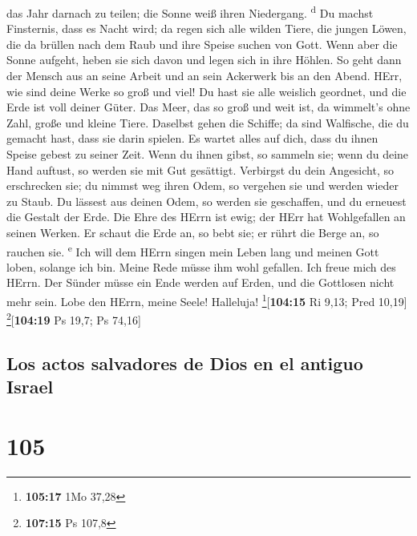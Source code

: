 das Jahr darnach zu teilen; die Sonne weiß ihren Niedergang.
\textsuperscript{d}  Du machst Finsternis, dass es Nacht
wird; da regen sich alle wilden Tiere,  die jungen Löwen,
die da brüllen nach dem Raub und ihre Speise suchen von Gott.
 Wenn aber die Sonne aufgeht, heben sie sich davon und
legen sich in ihre Höhlen.  So geht dann der Mensch aus
an seine Arbeit und an sein Ackerwerk bis an den Abend. 
HErr, wie sind deine Werke so groß und viel! Du hast sie alle weislich
geordnet, und die Erde ist voll deiner Güter.  Das Meer,
das so groß und weit ist, da wimmelt's ohne Zahl, große und kleine
Tiere.  Daselbst gehen die Schiffe; da sind Walfische,
die du gemacht hast, dass sie darin spielen.  Es wartet
alles auf dich, dass du ihnen Speise gebest zu seiner Zeit.
 Wenn du ihnen gibst, so sammeln sie; wenn du deine Hand
auftust, so werden sie mit Gut gesättigt.  Verbirgst du
dein Angesicht, so erschrecken sie; du nimmst weg ihren Odem, so
vergehen sie und werden wieder zu Staub.  Du lässest aus
deinen Odem, so werden sie geschaffen, und du erneuest die Gestalt der
Erde.  Die Ehre des HErrn ist ewig; der HErr hat
Wohlgefallen an seinen Werken.  Er schaut die Erde an, so
bebt sie; er rührt die Berge an, so rauchen sie. \textsuperscript{e}
 Ich will dem HErrn singen mein Leben lang und meinen
Gott loben, solange ich bin.  Meine Rede müsse ihm wohl
gefallen. Ich freue mich des HErrn.  Der Sünder müsse ein
Ende werden auf Erden, und die Gottlosen nicht mehr sein. Lobe den
HErrn, meine Seele! Halleluja! \footnote{\textbf{105:17} 1Mo 37,28}{[}\textbf{104:15}
Ri 9,13; Pred 10,19{]} \footnote{\textbf{107:15} Ps 107,8}{[}\textbf{104:19}
Ps 19,7; Ps 74,16{]}

\hypertarget{los-actos-salvadores-de-dios-en-el-antiguo-israel}{%
\subsection{Los actos salvadores de Dios en el antiguo
Israel}\label{los-actos-salvadores-de-dios-en-el-antiguo-israel}}

\hypertarget{section-104}{%
\section{105}\label{section-104}}

